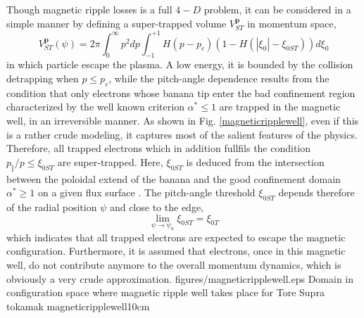 Though magnetic ripple losses is a full $4-D$ problem, it can be considered
in a simple manner by defining a super-trapped volume $V_{ST}^{\mathbf{p}}$
in momentum space,
\begin{equation}
V_{ST}^{\mathbf{p}}\left( \psi\right) =2\pi\int_{0}^{\infty}p^{2}dp\int
_{-1}^{+1}H\left( p-p_{c}\right) \left( 1-H\left( \left| \xi_{0}\right|
-\xi_{0ST}\right) \right) d\xi_{0}
\end{equation}
in which particle escape the plasma. A low energy, it is bounded by the
collision detrapping when $p\leq p_{c}$, while the pitch-angle dependence
results from the condition that only electrons whose banana tip enter the
bad confinement region characterized by the well known criterion $%
\alpha^{*}\leq1$ are trapped in the magnetic well, in an irreversible
manner. As shown in Fig. \ref{magneticripplewell}, even if this is a rather
crude modeling, it captures most of the salient features of the physics.
Therefore, all trapped electrons which in addition fullfils the condition $%
p_{\Vert}/p\leq\xi_{0ST}$ are super-trapped. Here, $\xi_{0ST}$ is deduced
from the intersection between the poloidal extend of the banana and the good
confinement domain $\alpha^{*}\geq1$ on a given flux surface \cite{ju02}.
The pitch-angle threshold $\xi_{0ST}$ depends therefore of the radial
position $\psi$ and close to the edge,
\begin{equation}
\lim_{\psi\rightarrow\psi_{a}}\xi_{0ST}=\xi_{0T}
\end{equation}
which indicates that all trapped electrons are expected to escape the
magnetic configuration. Furthermore, it is assumed that electrons, once in
this magnetic well, do not contribute anymore to the overall momentum
dynamics, which is obviously a very crude approximation.
\fig
{figures/magneticripplewell.eps} { Domain in configuration space where magnetic ripple well  takes place for Tore Supra tokamak}
{magneticripplewell}{10cm} %

